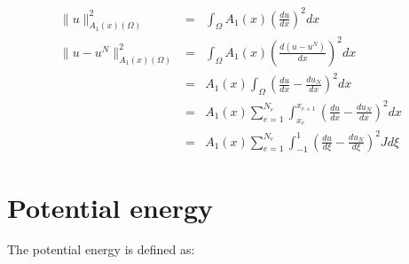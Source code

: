 \documentclass[paper=a4, fontsize=11pt]{article} %
\begin{document}
\begin{eqnarray}
\| u \| _{A_1(x) (\Omega)}^2 &=&\int_{\Omega} A_1(x)(\frac{du}{dx})^2 dx\nonumber\\
\| u -u^N \| _{A_1(x)(\Omega)} ^2 &=& \int_{\Omega} A_1(x) (\frac{d(u-u^N)}{dx})^2 dx\nonumber\\
&=& A_1(x) \int_{\Omega} (\frac{du}{dx} - \frac{du_N}{dx})^2 dx\nonumber\\
&=& A_1(x) \sum_{e=1}^{N_e} \int_{x_e}^{x_{e+1}} (\frac{du}{dx} - \frac{du_N}{dx})^2 dx \nonumber\\
&=& A_1(x) \sum_{e=1}^{N_e} \int_{-1}^{1} (\frac{du}{d\xi} - \frac{du_N}{d\xi})^2 J d\xi
\end{eqnarray}





\section{Potential energy}
The potential energy is defined as:
\end{document}

